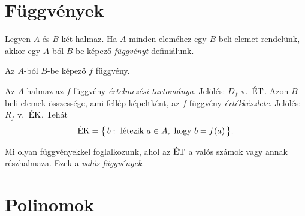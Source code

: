 \documentclass[11pt]{article}
\begin{document}

\section{Függvények}

\begin{defbox}
\begin{definition}[Függvény]
Legyen $A$ és $B$ két halmaz. Ha $A$ minden eleméhez egy $B$-beli elemet rendelünk, akkor egy $A$-ból $B$-be képező \emph{függvényt} definiálunk.
\end{definition}
\end{defbox}

\begin{notefig}{Az $A$-ból $B$-be képező $f$ függvény.}
\end{notefig}

\begin{defbox}
\begin{definition}
Az $A$ halmaz az $f$ függvény \emph{értelmezési tartománya}. Jelölés: $D_f$ v.\ $\ET$. Azon $B$-beli elemek összessége, ami fellép képeltként, az $f$ függvény \emph{értékkészlete}. Jelölés: $R_f$ v.\ $\EK$. Tehát
\[
\EK=\bigl\{\,b:\ \text{létezik } a\in A, \text{ hogy } b=f(a)\,\bigr\}.
\]
\end{definition}
\end{defbox}
Mi olyan függvényekkel foglalkozunk, ahol az $\ET$ a valós számok vagy annak részhalmaza. Ezek a \emph{valós függvények}.

\section{Polinomok}
\end{document}
